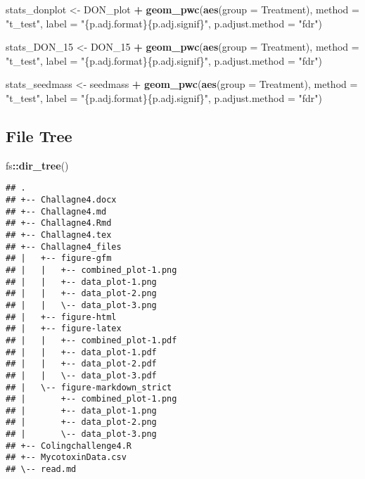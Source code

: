 \documentclass[
]{article}
\newenvironment{Shaded}{\begin{snugshade}}{\end{snugshade}}
\newcommand{\AttributeTok}[1]{\textcolor[rgb]{0.13,0.29,0.53}{#1}}
\newcommand{\FunctionTok}[1]{\textcolor[rgb]{0.13,0.29,0.53}{\textbf{#1}}}
\newcommand{\NormalTok}[1]{#1}
\newcommand{\OtherTok}[1]{\textcolor[rgb]{0.56,0.35,0.01}{#1}}
\newcommand{\SpecialCharTok}[1]{\textcolor[rgb]{0.81,0.36,0.00}{\textbf{#1}}}
\newcommand{\StringTok}[1]{\textcolor[rgb]{0.31,0.60,0.02}{#1}}
\begin{document}
\begin{Shaded}
\begin{Highlighting}[]
\NormalTok{stats\_donplot }\OtherTok{\textless{}{-}}\NormalTok{ DON\_plot }\SpecialCharTok{+} 
  \FunctionTok{geom\_pwc}\NormalTok{(}\FunctionTok{aes}\NormalTok{(}\AttributeTok{group =}\NormalTok{ Treatment), }\AttributeTok{method =} \StringTok{"t\_test"}\NormalTok{, }\AttributeTok{label =} \StringTok{"\{p.adj.format\}\{p.adj.signif\}"}\NormalTok{, }\AttributeTok{p.adjust.method =} \StringTok{"fdr"}\NormalTok{)}

\NormalTok{stats\_DON\_15 }\OtherTok{\textless{}{-}}\NormalTok{ DON\_15 }\SpecialCharTok{+} 
  \FunctionTok{geom\_pwc}\NormalTok{(}\FunctionTok{aes}\NormalTok{(}\AttributeTok{group =}\NormalTok{ Treatment), }\AttributeTok{method =} \StringTok{"t\_test"}\NormalTok{, }\AttributeTok{label =} \StringTok{"\{p.adj.format\}\{p.adj.signif\}"}\NormalTok{, }\AttributeTok{p.adjust.method =} \StringTok{"fdr"}\NormalTok{)}

\NormalTok{stats\_seedmass }\OtherTok{\textless{}{-}}\NormalTok{ seedmass }\SpecialCharTok{+} 
  \FunctionTok{geom\_pwc}\NormalTok{(}\FunctionTok{aes}\NormalTok{(}\AttributeTok{group =}\NormalTok{ Treatment), }\AttributeTok{method =} \StringTok{"t\_test"}\NormalTok{, }\AttributeTok{label =} \StringTok{"\{p.adj.format\}\{p.adj.signif\}"}\NormalTok{, }\AttributeTok{p.adjust.method =} \StringTok{"fdr"}\NormalTok{)}
\end{Highlighting}
\end{Shaded}

\subsection{\texorpdfstring{\textbf{File
Tree}}{File Tree}}\label{file-tree}

\begin{Shaded}
\begin{Highlighting}[]
\NormalTok{fs}\SpecialCharTok{::}\FunctionTok{dir\_tree}\NormalTok{()}
\end{Highlighting}
\end{Shaded}

\begin{verbatim}
## .
## +-- Challagne4.docx
## +-- Challagne4.md
## +-- Challagne4.Rmd
## +-- Challagne4.tex
## +-- Challagne4_files
## |   +-- figure-gfm
## |   |   +-- combined_plot-1.png
## |   |   +-- data_plot-1.png
## |   |   +-- data_plot-2.png
## |   |   \-- data_plot-3.png
## |   +-- figure-html
## |   +-- figure-latex
## |   |   +-- combined_plot-1.pdf
## |   |   +-- data_plot-1.pdf
## |   |   +-- data_plot-2.pdf
## |   |   \-- data_plot-3.pdf
## |   \-- figure-markdown_strict
## |       +-- combined_plot-1.png
## |       +-- data_plot-1.png
## |       +-- data_plot-2.png
## |       \-- data_plot-3.png
## +-- Colingchallenge4.R
## +-- MycotoxinData.csv
## \-- read.md
\end{verbatim}
\end{document}
